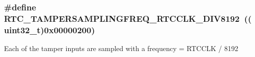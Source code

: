 \subsubsection[{\texorpdfstring{R\+T\+C\+\_\+\+T\+A\+M\+P\+E\+R\+S\+A\+M\+P\+L\+I\+N\+G\+F\+R\+E\+Q\+\_\+\+R\+T\+C\+C\+L\+K\+\_\+\+D\+I\+V8192}{RTC_TAMPERSAMPLINGFREQ_RTCCLK_DIV8192}}]{\setlength{\rightskip}{0pt plus 5cm}\#define R\+T\+C\+\_\+\+T\+A\+M\+P\+E\+R\+S\+A\+M\+P\+L\+I\+N\+G\+F\+R\+E\+Q\+\_\+\+R\+T\+C\+C\+L\+K\+\_\+\+D\+I\+V8192~((uint32\+\_\+t)0x00000200)}\hypertarget{group___r_t_c_ex___tamper___sampling___frequencies___definitions_ga48899e13c9b392c02278cd4166b49f4d}{}\label{group___r_t_c_ex___tamper___sampling___frequencies___definitions_ga48899e13c9b392c02278cd4166b49f4d}
Each of the tamper inputs are sampled with a frequency = R\+T\+C\+C\+LK / 8192 